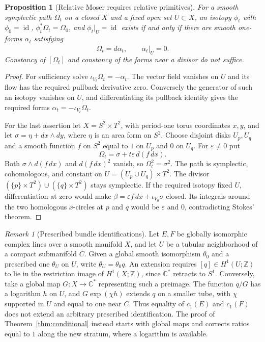 \documentclass[11pt]{article}
\newtheorem{proposition}[theorem]{Proposition}
\theoremstyle{definition}
\theoremstyle{remark}
\newtheorem{remark}[theorem]{Remark}
\newcommand{\C}{\mathbb C}
\newcommand{\Z}{\mathbb Z}
\newcommand{\id}{\operatorname{id}}
\begin{document}
\begin{proposition}[Relative Moser requires relative primitives]\label{prop:relativeMoser}
For a smooth symplectic path $\Omega_t$ on a closed $X$ and a fixed open set $U\subset X$, an isotopy $\phi_t$ with $\phi_0=\id$, $\phi_t^*\Omega_t=\Omega_0$, and $\phi_t|_U=\id$ exists if and only if there are smooth one-forms $\alpha_t$ satisfying
\[
 \dot\Omega_t=d\alpha_t,\qquad \alpha_t|_U=0.
\]
Constancy of $[\Omega_t]$ and constancy of the forms near a divisor do not suffice.
\end{proposition}
\begin{proof}
For sufficiency solve $\iota_{V_t}\Omega_t=-\alpha_t$. The vector field vanishes on $U$ and its flow has the required pullback derivative zero. Conversely the generator of such an isotopy vanishes on $U$, and differentiating its pullback identity gives the required forms $\alpha_t=-\iota_{V_t}\Omega_t$.

For the last assertion let $X=S^2\times T^2$, with period-one torus coordinates $x,y$, and let $\sigma=\eta+dx\wedge dy$, where $\eta$ is an area form on $S^2$. Choose disjoint disks $U_p,U_q$ and a smooth function $f$ on $S^2$ equal to $1$ on $U_p$ and $0$ on $U_q$. For $\varepsilon\ne0$ put
\[
 \Omega_t=\sigma+t\varepsilon\,d(f\,dx).
\]
Both $\sigma\wedge d(f\,dx)$ and $d(f\,dx)^2$ vanish, so $\Omega_t^2=\sigma^2$. The path is symplectic, cohomologous, and constant on $U=(U_p\cup U_q)\times T^2$. The divisor
$(\{p\}\times T^2)\cup(\{q\}\times T^2)$ stays symplectic. If the required isotopy fixed $U$, differentiation at zero would make
$\beta=\varepsilon f\,dx+\iota_{V_0}\sigma$ closed. Its integrals around the two homologous $x$-circles at $p$ and $q$ would be $\varepsilon$ and $0$, contradicting Stokes' theorem.
\end{proof}

\begin{remark}[Prescribed bundle identifications]
Let $E,F$ be globally isomorphic complex lines over a smooth manifold $X$, and let $U$ be a tubular neighborhood of a compact submanifold $C$. Given a global smooth isomorphism $\theta_0$ and a prescribed one $\theta_U$ on $U$, write $\theta_U=\theta_0q$. An extension requires $[q]\in H^1(U;\Z)$ to lie in the restriction image of $H^1(X;\Z)$, since $\C^*$ retracts to $S^1$. Conversely, take a global map $G:X\to\C^*$ representing such a preimage. The function $q/G$ has a logarithm $h$ on $U$, and $G\exp(\chi h)$ extends $q$ on a smaller tube, with $\chi$ supported in $U$ and equal to one near $C$. Thus equality of $c_1(E)$ and $c_1(F)$ does not extend an arbitrary prescribed identification. The proof of Theorem~\ref{thm:conditional} instead starts with global maps and corrects ratios equal to $1$ along the new stratum, where a logarithm is available.
\end{remark}
\end{document}
